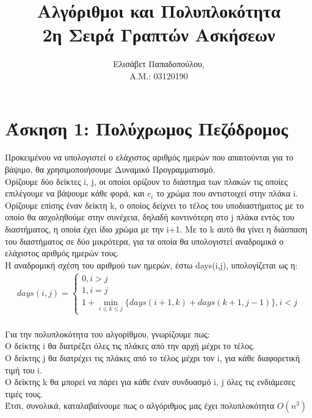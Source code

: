 \documentclass{article}
\begin{document}
\title{\section*{\centering Αλγόριθμοι και Πολυπλοκότητα\\[1ex] 2η Σειρά Γραπτών Ασκήσεων}}
\date{}
\author{Ελισάβετ Παπαδοπούλου, \\ Α.Μ.: 03120190}
\maketitle

\section*{\large Άσκηση 1: Πολύχρωμος Πεζόδρομος}
Προκειμένου να υπολογιστεί ο ελάχιστος αριθμός ημερών που απαιτούνται για το βάψιμο, θα χρησιμοποιήσουμε Δυναμικό Προγραμματισμό. \\
Ορίζουμε δύο δείκτες i, j, οι οποίοι ορίζουν το διάστημα των πλακών τις οποίες επιλέγουμε να βάψουμε κάθε φορά, και $c_i$ το χρώμα που αντιστοιχεί στην πλάκα i. Ορίζουμε επίσης έναν δείκτη k, ο οποίος δείχνει το τέλος του υποδιαστήματος με το οποίο θα ασχοληθούμε στην συνέχεια, δηλαδή κοντινότερη στο j πλάκα εντός του διαστήματος, η οποία έχει ίδιο χρώμα με την i+1. Με το k αυτό θα γίνει η διάσπαση του διαστήματος σε δύο μικρότερα, για τα οποία θα υπολογιστεί αναδρομικά ο ελάχιστος αριθμός ημερών τους. \\
Η αναδρομική σχέση του αριθμού των ημερών, έστω days(i,j), υπολογίζεται ως η:
\begin{align*}
days(i,j) = 
	\begin{cases}
		0,  i > j \\
		1,  i = j \\
		1 + \min_{i \leq k \leq j}\{ days(i+1, k) + days(k+1, j-1) \}, i < j
	\end{cases}
\end{align*}
\\
Για την πολυπλοκότητα του αλγορίθμου, γνωρίζουμε πως: \\
Ο δείκτης i θα διατρέξει όλες τις πλάκες από την αρχή μέχρι το τέλος. \\
Ο δείκτης j θα διατρέχει τις πλάκες από το τέλος μέχρι τον i, για κάθε διαφορετική τιμή του i.\\ 
Ο δείκτης k θα μπορεί  να πάρει για κάθε έναν συνδυασμό i, j όλες τις ενδιάμεσες τιμές τους. \\
Έτσι, συνολικά, καταλαβαίνουμε πως ο αλγόριθμος μας έχει πολυπλοκότητα $O(n^3)$
\end{document}
